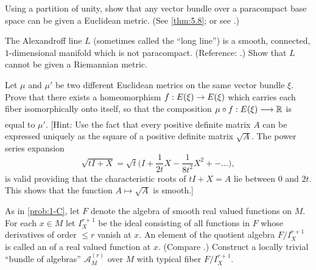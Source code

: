 \documentclass[../main]{subfiles}
\begin{document}
\begin{problem}\label{prob-2-C}
Using a partition of unity, show that any vector bundle over a paracompact base space can be given a Euclidean metric. (See \ref{thm:5.8}; or see \cite[pp. 156 and 171]{kelley1955}.)
\end{problem}


\begin{problem}\label{prob-2-D}
The Alexandroff line $L$ (sometimes called the ``long line'') is a smooth, connected, $1$-dimensional manifold which is not paracompact. (Reference: \cite{kneser1958}.) Show that $L$ cannot be given a Riemannian metric.
\end{problem}


\begin{problem}\label{prob-2-E}
Let $\mu$ and $\mu'$ be two different Euclidean metrics on the same vector bundle $\xi$. Prove that there exists a homeomorphism $f : E(\xi)\to E(\xi)$ which carries each fiber isomorphically onto itself, so that the composition  $\mu \circ f : \total(\xi)\varrightarrow{} \bR$ is equal to $\mu'$. [Hint: Use the fact that every positive definite matrix $A$ can be expressed uniquely as the square of a positive definite matrix $\sqrt{A}$. The power
series expansion 
\[
\sqrt{tI+X} = \sqrt{t}\bigg(I + \frac{1}{2t}X - \frac{1}{8t^2}X^2 + - \dots \bigg),
\]
is valid providing that the characteristic roots of $tI+X = A$ lie between $0$ and $2t$. This shows that the function $A \mapsto \sqrt{A}$ is smooth.]
\end{problem}


\begin{problem}\label{prob-2-F}
As in \ref{prob:1-C}, let $F$ denote the algebra of smooth real valued functions on $M$. For each $x\in M$ let $I^{r+1}_X$ be the ideal consisting of all functions in $F$ whose derivatives of order $\leq r$ vanish at $x$. An element of the quotient algebra $F/I^{r+1}_X$ is called an  of a real valued function at $x$. (Compare \cite{ehresmann1953}.) Construct a locally trivial ``bundle of algebras'' $\mathcal{A}_M^{(r)}$ over $M$ with typical fiber $F/I^{r+1}_X$.
\end{problem}
\end{document}
